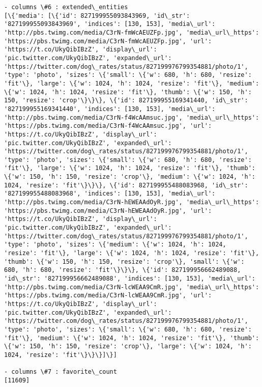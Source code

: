 \documentclass[11pt]{article}
\begin{document}
\begin{Verbatim}[commandchars=\\\{\}]
- columns \#6 : extended\_entities
[\{'media': [\{'id': 827199955093843969, 'id\_str': '827199955093843969', 'indices': [130, 153], 'media\_url': 'http://pbs.twimg.com/media/C3rN-fmWcAEUZFp.jpg', 'media\_url\_https': 'https://pbs.twimg.com/media/C3rN-fmWcAEUZFp.jpg', 'url': 'https://t.co/UkyQibIBzZ', 'display\_url': 'pic.twitter.com/UkyQibIBzZ', 'expanded\_url': 'https://twitter.com/dog\_rates/status/827199976799354881/photo/1', 'type': 'photo', 'sizes': \{'small': \{'w': 680, 'h': 680, 'resize': 'fit'\}, 'large': \{'w': 1024, 'h': 1024, 'resize': 'fit'\}, 'medium': \{'w': 1024, 'h': 1024, 'resize': 'fit'\}, 'thumb': \{'w': 150, 'h': 150, 'resize': 'crop'\}\}\}, \{'id': 827199955169341440, 'id\_str': '827199955169341440', 'indices': [130, 153], 'media\_url': 'http://pbs.twimg.com/media/C3rN-f4WcAAmsuc.jpg', 'media\_url\_https': 'https://pbs.twimg.com/media/C3rN-f4WcAAmsuc.jpg', 'url': 'https://t.co/UkyQibIBzZ', 'display\_url': 'pic.twitter.com/UkyQibIBzZ', 'expanded\_url': 'https://twitter.com/dog\_rates/status/827199976799354881/photo/1', 'type': 'photo', 'sizes': \{'small': \{'w': 680, 'h': 680, 'resize': 'fit'\}, 'large': \{'w': 1024, 'h': 1024, 'resize': 'fit'\}, 'thumb': \{'w': 150, 'h': 150, 'resize': 'crop'\}, 'medium': \{'w': 1024, 'h': 1024, 'resize': 'fit'\}\}\}, \{'id': 827199955488083968, 'id\_str': '827199955488083968', 'indices': [130, 153], 'media\_url': 'http://pbs.twimg.com/media/C3rN-hEWEAAdOyR.jpg', 'media\_url\_https': 'https://pbs.twimg.com/media/C3rN-hEWEAAdOyR.jpg', 'url': 'https://t.co/UkyQibIBzZ', 'display\_url': 'pic.twitter.com/UkyQibIBzZ', 'expanded\_url': 'https://twitter.com/dog\_rates/status/827199976799354881/photo/1', 'type': 'photo', 'sizes': \{'medium': \{'w': 1024, 'h': 1024, 'resize': 'fit'\}, 'large': \{'w': 1024, 'h': 1024, 'resize': 'fit'\}, 'thumb': \{'w': 150, 'h': 150, 'resize': 'crop'\}, 'small': \{'w': 680, 'h': 680, 'resize': 'fit'\}\}\}, \{'id': 827199956662489088, 'id\_str': '827199956662489088', 'indices': [130, 153], 'media\_url': 'http://pbs.twimg.com/media/C3rN-lcWEAA9CmR.jpg', 'media\_url\_https': 'https://pbs.twimg.com/media/C3rN-lcWEAA9CmR.jpg', 'url': 'https://t.co/UkyQibIBzZ', 'display\_url': 'pic.twitter.com/UkyQibIBzZ', 'expanded\_url': 'https://twitter.com/dog\_rates/status/827199976799354881/photo/1', 'type': 'photo', 'sizes': \{'small': \{'w': 680, 'h': 680, 'resize': 'fit'\}, 'medium': \{'w': 1024, 'h': 1024, 'resize': 'fit'\}, 'thumb': \{'w': 150, 'h': 150, 'resize': 'crop'\}, 'large': \{'w': 1024, 'h': 1024, 'resize': 'fit'\}\}\}]\}]

- columns \#7 : favorite\_count
[11609]


\end{Verbatim}
\end{document}
